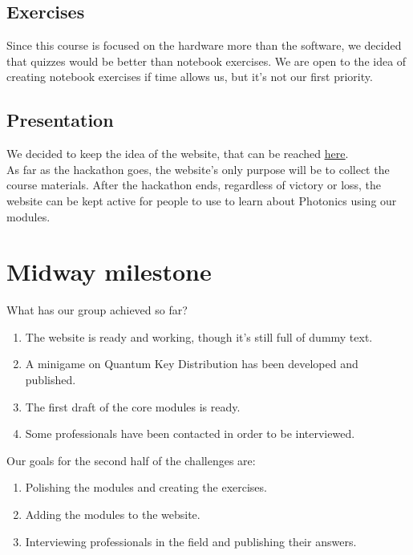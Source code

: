 \documentclass[hidelinks, a4paper,12pt]{article}
\begin{document}
\subsection{Exercises}
Since this course is focused on the hardware more than the software, we decided that quizzes would be better than notebook exercises. We are open to the idea of creating notebook exercises if time allows us, but it's not our first priority.
\subsection{Presentation}
We decided to keep the idea of the website, that can be reached \href{https://cosmcif.github.io/photonics-qworld-challenge/index.html}{\underline{here}}.\\As far as the hackathon goes, the website's only purpose will be to collect the course materials. After the hackathon ends, regardless of victory or loss, the website can be kept active for people to use to learn about Photonics using our modules.

\newpage
\section{Midway milestone}
What has our group achieved so far?
\begin{enumerate}
  \item The website is ready and working, though it's still full of dummy text.
  \item A minigame on Quantum Key Distribution has been developed and published.
  \item The first draft of the core modules is ready. 
  \item Some professionals have been contacted in order to be interviewed.
\end{enumerate}
Our goals for the second half of the challenges are:
\begin{enumerate}
  \item Polishing the modules and creating the exercises.
  \item Adding the modules to the website.
  \item Interviewing professionals in the field and publishing their answers.
\end{enumerate}
\end{document}
